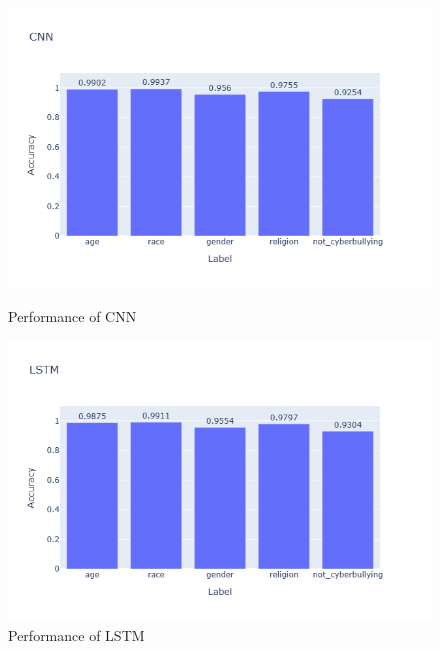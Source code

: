 \documentclass[pdflatex,sn-mathphys-num]{sn-jnl}%
\theoremstyle{thmstyleone}%
\theoremstyle{thmstyletwo}%
\theoremstyle{thmstylethree}%
\begin{document}
\begin{figure}[H]
    \begin{minipage}{0.48\textwidth}
        \centering
        \includegraphics[width=\textwidth]{Graphs/CNN.png}
        \caption{Performance of CNN}
        \label{fig:cnn}
    \end{minipage}
    \hfill
    \begin{minipage}{0.48\textwidth}
        \centering
        \includegraphics[width=\textwidth]{Graphs/LSTM.png}
        \caption{Performance of LSTM}
        \label{fig:lstm}
    \end{minipage}
\end{figure}
\end{document}
